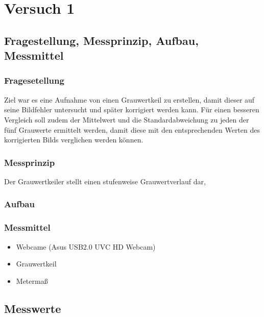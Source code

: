 \chapter{Versuch 1}
\label{chap:VERSUCH_1}


\section{Fragestellung, Messprinzip, Aufbau, Messmittel}
\label{chap:VERSUCH_1_FRAGESTELLUNG}

\subsection*{Fragesetellung}

Ziel war es eine Aufnahme von einen Grauwertkeil zu erstellen, damit dieser auf seine Bildfehler untersucht und später korrigiert werden kann.
Für einen besseren Vergleich soll zudem der Mittelwert und die Standardabweichung zu jeden der fünf Grauwerte ermittelt werden, damit diese mit den entsprechenden Werten des korrigierten Bilds verglichen werden können.

\subsection*{Messprinzip}
Der Grauwertkeiler stellt einen stufenweise Grauwertverlauf dar, 

\subsection*{Aufbau}

\subsection*{Messmittel}
\begin{itemize}
\item Webcame (Asus USB2.0 UVC HD Webcam)
\item Grauwertkeil
\item Metermaß
\end{itemize}

\section{Messwerte}
\label{chap:VERSUCH_1_MESSWERTE}

